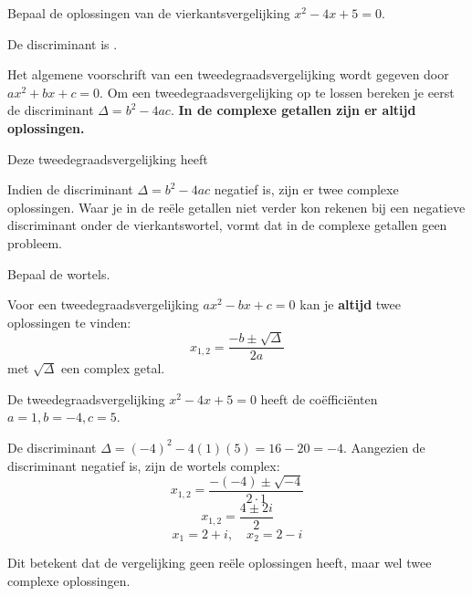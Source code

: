 \documentclass{ximera}
\begin{document}
\begin{exercise}
    Bepaal de oplossingen van de vierkantsvergelijking \(x^2 - 4x + 5 = 0\).  
    
    \begin{question}
    De discriminant is \choicenegatief.
    
    \begin{feedback}
    Het algemene voorschrift van een tweedegraadsvergelijking wordt gegeven door \(ax^2 + bx + c = 0\).
    Om een tweedegraadsvergelijking op te lossen bereken je eerst de discriminant \(\Delta = b^2 - 4ac\).
    \textbf{In de complexe getallen zijn er altijd oplossingen.}
    \end{feedback}
    \end{question}
    
    \begin{question}
    Deze tweedegraadsvergelijking heeft \choicetweec 
    
    \begin{feedback}
    Indien de discriminant \(\Delta = b^2 - 4ac\) negatief is, zijn er twee complexe oplossingen. Waar je in de reële getallen niet verder kon rekenen bij een negatieve discriminant onder de vierkantswortel, vormt dat in de complexe getallen geen probleem. 
    \end{feedback}
    \end{question}
    
    \begin{question}
    Bepaal de wortels.
    
    \begin{hint}
    Voor een tweedegraadsvergelijking \(ax^2 - bx + c = 0\) kan je \textbf{altijd} twee oplossingen te vinden: 
    \[ x_{1,2} = \frac{-b \pm \sqrt{\Delta}}{2a} \]
    met \(\sqrt{\Delta}\) een complex getal.
    \end{hint}
    \end{question}
    
    \begin{oplossing}
    De tweedegraadsvergelijking \(x^2 - 4x + 5 = 0\) heeft de coëfficiënten \(a = 1, b = -4, c = 5\).
    
    De discriminant \( \Delta = (-4)^2 - 4(1)(5) = 16 - 20 = -4 \).
    Aangezien de discriminant negatief is, zijn de wortels complex:
    \[ x_{1,2} = \frac{-(-4) \pm \sqrt{-4}}{2\cdot1} \]
    \[ x_{1,2} = \frac{4 \pm 2i}{2} \]
    \[ x_{1} = 2 + i, \quad x_{2} = 2 - i \]
    
    Dit betekent dat de vergelijking geen reële oplossingen heeft, maar wel twee complexe oplossingen.
    \end{oplossing}
        
\end{exercise}
        
\end{document}

